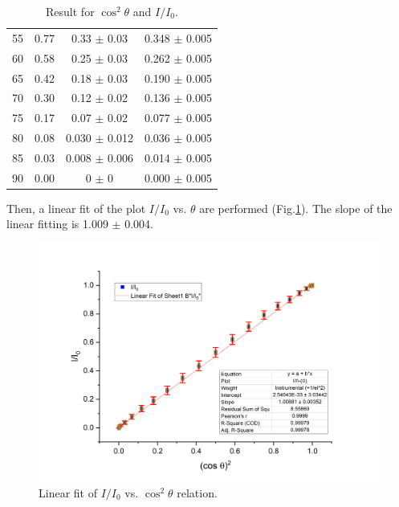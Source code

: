 \documentclass[a4paper]{article}
\begin{document}
\begin{table}[H]
\begin{tabular}{cccc}
		55                                     & 0.77                                           & 0.33  $\pm$ 0.03   & 0.348  $\pm$ 0.005 \\
		60                                     & 0.58                                           & 0.25  $\pm$ 0.03   & 0.262  $\pm$ 0.005 \\
		65                                     & 0.42                                           & 0.18  $\pm$ 0.03   & 0.190  $\pm$ 0.005 \\
		70                                     & 0.30                                           & 0.12  $\pm$ 0.02   & 0.136  $\pm$ 0.005 \\
		75                                     & 0.17                                           & 0.07  $\pm$ 0.02   & 0.077  $\pm$ 0.005 \\
		80                                     & 0.08                                           & 0.030  $\pm$ 0.012 & 0.036  $\pm$ 0.005 \\
		85                                     & 0.03                                           & 0.008  $\pm$ 0.006 & 0.014  $\pm$ 0.005 \\
		90                                     & 0.00                                           & 0      $\pm$ 0     & 0.000  $\pm$ 0.005 \\
		\hline
	\end{tabular}
	\caption{Result for $\cos^2\theta$ and $I/I_0$.}
	\label{table::cosine}
\end{table}

Then, a linear fit of the plot $I/I_0$ vs. $\theta$ are performed (Fig.\ref{fig::Malus Law}). The slope of the linear fitting is 1.009 $\pm$ 0.004.

\begin{figure}[H]
	\centering
	\includegraphics[scale=0.5]{Linear fit_Malus law.png}
	\caption{Linear fit of $I/I_0$ vs. $\cos^2\theta$ relation.}
	\label{fig::Malus Law}
\end{figure}
\end{document}
